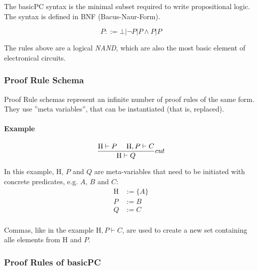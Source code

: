 The basicPC syntax is the minimal subset required to write propositional logic. The syntax is defined in BNF (Bacus-Naur-Form).

\[
	P ::= \bot | \neg P | P \land P | P
\]

The rules above are a logical \emph{NAND}, which are also the most basic element of electronical circuits.

\subsubsection{Proof Rule Schema}

Proof Rule schemas represent an infinite number of proof rules of the same form. They use ''meta variables'', that can be instantiated (that is, replaced).

\paragraph{Example} 
\[
	\frac{
		\text{H} \vdash P \text{ }\text{ }\text{ }\text{ } \text{H}, P \vdash C
	 }{
		\text{H} \vdash Q
	} cut
\]

In this example, H, $P$ and $Q$ are meta-variables that need to be initiated with concrete predicates, e.g. $A$, $B$ and $C$: \begin{align*}
  \text{H} &:= \{A\} \\
	P &:= B \\
	Q &:= C \\
\end{align*}

Commas, like in the example $\text{H}, P \vdash C$, are used to create a new set containing alle elements from H and $P$.

\subsubsection{Proof Rules of basicPC}

